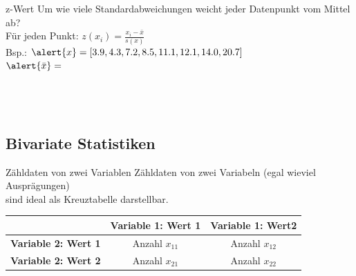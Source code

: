 \begin{frame}
  {z-Wert}
  Um wie viele Standardabweichungen weicht jeder Datenpunkt vom Mittel ab?\\
  Für jeden Punkt: \alert{$z(x_i)=\frac{x_i-\bar{x}}{s(x)}$}\\[3ex]

  Bsp.: $\alert{x}=[3.9, 4.3, 7.2, 8.5, 11.1, 12.1, 14.0, 20.7]$\\[1ex]
  $\alert{\bar{x}}=$\\[1ex]
  \\[1ex]
  \\[1ex]
  \\[1ex]
\end{frame}

\subsection{Bivariate Statistiken}

\begin{frame}
  {Zähldaten von zwei Variablen}
  Zähldaten von zwei Variabeln (egal wieviel Ausprägungen)\\
  sind ideal als \alert{Kreuztabelle} darstellbar.\\
  \vspace{1cm}

  \begin{center}
    \begin{tabular}{|c|c|c|}
      \cline{2-3}
      \multicolumn{1}{c|}{} & \textbf{Variable 1: Wert 1} & \textbf{Variable 1: Wert2} \\
      \hline
      \textbf{Variable 2: Wert 1} & Anzahl $x_{11}$ & Anzahl $x_{12}$ \\
      \textbf{Variable 2: Wert 2} & Anzahl $x_{21}$ & Anzahl $x_{22}$ \\
      \hline
    \end{tabular}
  \end{center}
\end{frame}

